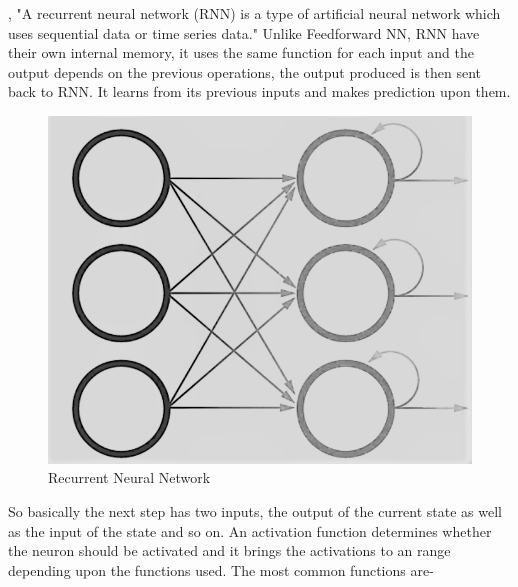 \documentclass[oneside,12pt]{Classes/RoboticsLaTeX}
\begin{document}
\cite{ibm}, "A recurrent neural network (RNN) is a type of artificial neural network which uses sequential data or time series data." Unlike Feedforward NN, RNN have their own internal memory, it uses the same function for each input and the output depends on the previous operations, the output produced is then sent back to RNN. It learns from its previous inputs and makes prediction upon them.
\begin{figure}[H]
  \centering
  \includegraphics[width=0.5\linewidth]{Figures/rnn.png}
  \caption{Recurrent Neural Network}
  \label{fig:rnn}
\end{figure}
So basically the next step has two inputs, the output of the current state as well as the input of the state and so on. An activation function determines whether the neuron should be activated and it brings the activations to an range depending upon the functions used. The most common functions are-
\end{document}
